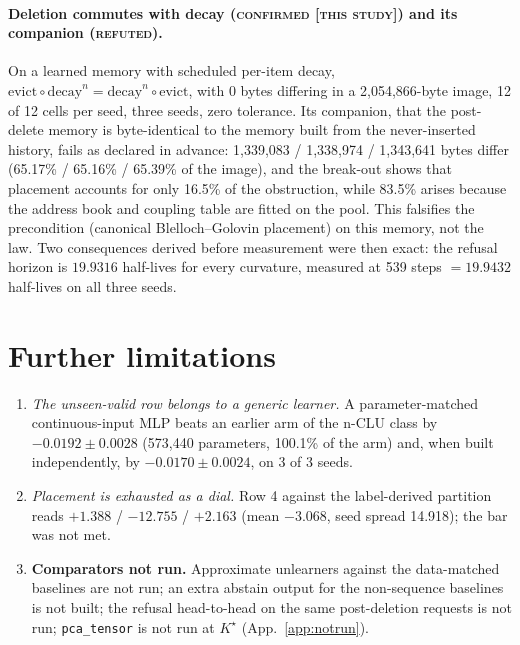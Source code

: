 \documentclass{article} %
\newcommand{\Kstar}{\ensuremath{K^{\star}}}
\begin{document}
\paragraph{Deletion commutes with decay (\textsc{confirmed [this study]}) and its companion
(\textsc{refuted}).} On a learned memory with scheduled per-item decay,
$\text{evict}\circ\text{decay}^n=\text{decay}^n\circ\text{evict}$, with 0 bytes differing in a
2,054,866-byte image, 12 of 12 cells per seed, three seeds, zero tolerance.
Its companion, that the post-delete memory is byte-identical to the memory built from the
never-inserted history, fails as declared in advance: 1,339,083 / 1,338,974 / 1,343,641 bytes differ
(65.17\% / 65.16\% / 65.39\% of the image), and the break-out shows that placement accounts for
only 16.5\% of the obstruction, while 83.5\% arises because the address book and coupling table
are fitted on the pool. %
This falsifies the precondition (canonical Blelloch--Golovin placement) on this memory, not the
law. Two consequences derived before measurement were then exact: the refusal horizon is $19.9316$
half-lives for every curvature, measured at 539 steps $=19.9432$ half-lives on all three seeds.


\section{Further limitations}
\label{app:morelimits}
\begin{enumerate}[leftmargin=*,itemsep=1pt]
\item \emph{The unseen-valid row belongs to a generic learner.} A parameter-matched
  continuous-input MLP beats an earlier arm of the n-CLU class by $-0.0192\pm0.0028$ (573,440
  parameters, 100.1\% of the arm) and, when built independently, by $-0.0170\pm0.0024$, on 3 of 3
  seeds. %
\item \emph{Placement is exhausted as a dial.} Row 4 against the label-derived partition reads
  $+1.388$ / $-12.755$ / $+2.163$ (mean $-3.068$, seed spread 14.918); the bar was not met.
\item \textbf{Comparators not run.} Approximate unlearners against the data-matched baselines are not
  run; an extra abstain output for the non-sequence baselines is not built; the refusal head-to-head on
  the same post-deletion requests is not run; \texttt{pca\_tensor} is not run at $\Kstar$
  (App.~\ref{app:notrun}).
\end{enumerate}
\end{document}

